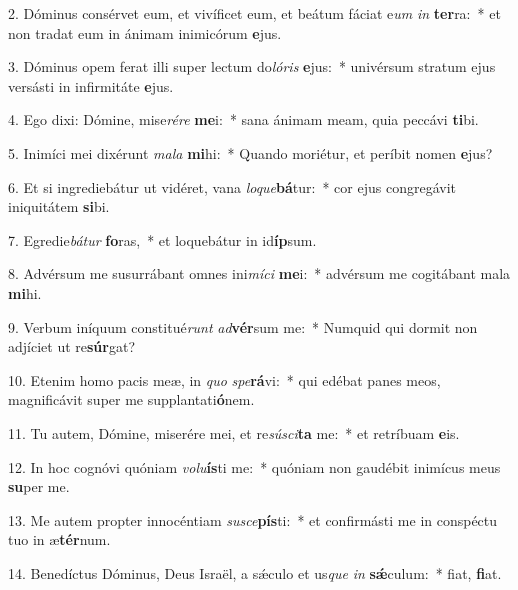 2. Dóminus consérvet eum, et vivíficet eum, et beátum fáciat e\textit{um} \textit{in} \textbf{ter}ra:~*  et non tradat eum in ánimam inimicórum \textbf{e}jus.\

3. Dóminus opem ferat illi super lectum do\textit{ló}\textit{ris} \textbf{e}jus:~*  univérsum stratum ejus versásti in infirmitáte \textbf{e}jus.\

4. Ego dixi: Dómine, mise\textit{ré}\textit{re} \textbf{me}i:~*  sana ánimam meam, quia peccávi \textbf{ti}bi.\

5. Inimíci mei dixérunt \textit{ma}\textit{la} \textbf{mi}hi:~*  Quando moriétur, et períbit nomen \textbf{e}jus?\

6. Et si ingrediebátur ut vidéret, vana \textit{lo}\textit{que}\textbf{bá}tur:~*  cor ejus congregávit iniquitátem \textbf{si}bi.\

7. Egredie\textit{bá}\textit{tur} \textbf{fo}ras,~*  et loquebátur in id\textbf{íp}sum.\

8. Advérsum me susurrábant omnes ini\textit{mí}\textit{ci} \textbf{me}i:~*  advérsum me cogitábant mala \textbf{mi}hi.\

9. Verbum iníquum constitué\textit{runt} \textit{ad}\textbf{vér}sum me:~*  Numquid qui dormit non adjíciet ut re\textbf{súr}gat?\

10. Etenim homo pacis meæ, in \textit{quo} \textit{spe}\textbf{rá}vi:~*  qui edébat panes meos, magnificávit super me supplantati\textbf{ó}nem.\

11. Tu autem, Dómine, miserére mei, et re\textit{sú}\textit{sci}\textbf{ta} me:~*  et retríbuam \textbf{e}is.\

12. In hoc cognóvi quóniam \textit{vo}\textit{lu}\textbf{ís}ti me:~*  quóniam non gaudébit inimícus meus \textbf{su}per me.\

13. Me autem propter innocéntiam \textit{su}\textit{sce}\textbf{pís}ti:~*  et confirmásti me in conspéctu tuo in æ\textbf{tér}num.\

14. Benedíctus Dóminus, Deus Israël, a sǽculo et us\textit{que} \textit{in} \textbf{sǽ}culum:~*  fiat, \textbf{fi}at.\

